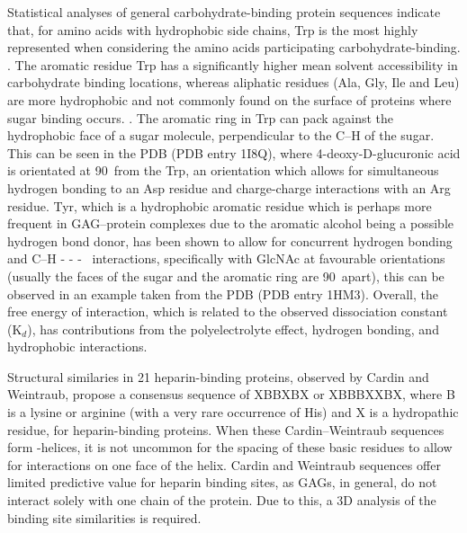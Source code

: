\documentclass[journal=jctcce,manuscript=article]{achemso}
\begin{document}
{Statistical analyses of general carbohydrate-binding protein sequences indicate that, for amino acids with hydrophobic side chains, Trp is the most highly represented when considering the amino acids participating carbohydrate-binding. \cite{Malik2007SequenceNetwork, Shionyu-Mitsuyama2003AnProteins}. 
The aromatic residue Trp has a significantly higher mean solvent accessibility in carbohydrate binding locations, whereas aliphatic residues (Ala, Gly, Ile and Leu) are more hydrophobic and not commonly found on the surface of proteins where sugar binding occurs. \cite{Malik2007SequenceNetwork, Shionyu-Mitsuyama2003AnProteins}. 
The aromatic ring in Trp can pack against the hydrophobic face of a sugar molecule, perpendicular to the C--H of the sugar. \cite{Gandhi2008TheProteins} 
This can be seen in the \ac{PDB} (PDB entry 1I8Q), where 4-deoxy-\small{D}-glucuronic acid is orientated at 90\textdegree~from the Trp, an orientation which allows for simultaneous hydrogen bonding to an Asp residue and charge-charge interactions with an Arg residue.\cite{Li2001HyaluronanLyase.}
Tyr, which is a hydrophobic aromatic residue which is perhaps more frequent in GAG--protein complexes due to the aromatic alcohol being a possible hydrogen bond donor, has been shown to allow for concurrent hydrogen bonding and C--H - - - \textpi~interactions, specifically with GlcNAc at favourable orientations (usually the faces of the sugar and the aromatic ring are 90\textdegree~apart), this can be observed in an example taken from the \ac{PDB} (PDB entry 1HM3). 
\cite{WeijunHuang2001ActiveMutagenesis}
Overall, the free energy of interaction, which is related to the observed dissociation constant (K$_{d}$), has contributions from the polyelectrolyte effect, hydrogen bonding, and hydrophobic interactions. \cite{Thompson1994EnergeticDomain}

Structural similaries in 21 heparin-binding proteins, observed by Cardin and Weintraub, propose a consensus sequence of XBBXBX or XBBBXXBX, where B is a lysine or arginine (with a very rare occurrence of His) and X is a hydropathic residue, for heparin-binding proteins. When these Cardin--Weintraub sequences form \textalpha-helices, it is not uncommon for the spacing of these basic residues to allow for interactions on one face of the helix. \cite{Capila2002Heparin-proteinInteractions.} 
Cardin and Weintraub sequences offer limited predictive value for heparin binding sites, as \acp{GAG}, in general, do not interact solely with one chain of the protein.\cite{Capila2002Heparin-proteinInteractions., Gandhi2008TheProteins} 
Due to this, a 3D analysis of the binding site similarities is required.

}
\end{document}
